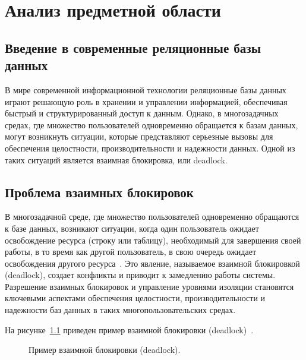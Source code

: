 \chapter{Анализ предметной области}

\section{Введение в современные реляционные базы данных}

В мире современной информационной технологии реляционные базы данных играют решающую роль в хранении и управлении информацией, обеспечивая быстрый и структурированный доступ к данным. 
Однако, в многозадачных средах, где множество пользователей одновременно обращается к базам данных, могут возникнуть ситуации, которые представляют серьезные вызовы для обеспечения целостности, производительности и надежности данных. 
Одной из таких ситуаций является взаимная блокировка, или deadlock.

\section{Проблема взаимных блокировок}

В многозадачной среде, где множество пользователей одновременно обращаются к базе данных, возникают ситуации, когда один пользователь ожидает освобождение ресурса (строку или таблицу), необходимый для завершения своей работы, в то время как другой пользователь, в свою очередь ожидает освобождения другого ресурса~\cite{deadlock_defin}. 
Это явление, называемое взаимной блокировкой (deadlock), создает конфликты и приводит к замедлению работы системы. 
Разрешение взаимных блокировок и управление уровнями изоляции становятся ключевыми аспектами обеспечения целостности, производительности и надежности баз данных в таких многопользовательских средах.

\clearpage

На рисунке~\ref{fig:deadlock} приведен пример взаимной блокировки (deadlock)~\cite{deadlock}.
\FloatBarrier
\begin{figure}[h]
	\caption{Пример взаимной блокировки (deadlock).}
	\label{fig:deadlock}
\end{figure}

